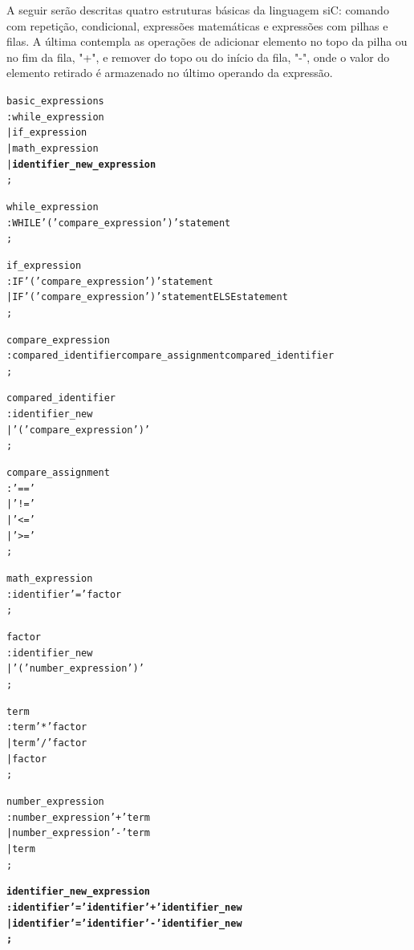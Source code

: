 \documentclass[12pt]{article}
\begin{document}
\indent 
\indent A seguir serão descritas quatro estruturas básicas da linguagem siC: comando com repetição, condicional, expressões matemáticas e expressões com pilhas e filas. A última contempla as operações de adicionar elemento no topo da pilha ou no fim da fila, "+", e remover do topo ou do início da fila, "-", onde o valor do elemento retirado é armazenado no último operando da expressão.
\begin{alltt}

basic\_expressions
    : while\_expression
    | if\_expression
    | math\_expression
    | \textbf{identifier\_new\_expression}
    ;	
		
while\_expression
    : WHILE '(' compare\_expression ')' statement
    ;

if\_expression
    : IF '(' compare\_expression ')' statement
    | IF '(' compare\_expression ')' statement ELSE statement
    ;
    
compare\_expression
    : compared\_identifier compare\_assignment compared\_identifier
    ;
    
compared\_identifier
    : identifier\_new
    | '(' compare\_expression ')'
    ;
    
compare\_assignment
    : '=='
    | '!='
    | '<='
    | '>='
    ;

math\_expression
    : identifier '=' factor
    ;

factor
    : identifier\_new
    | '(' number\_expression ')' 
    ;
    
term
    : term '*' factor
    | term '/' factor
    | factor
    ;

number\_expression
    : number\_expression '+' term
    | number\_expression '-' term
    | term
    ;
    
\textbf{
identifier\_new\_expression
    : identifier '=' identifier '+' identifier\_new
    | identifier '=' identifier '-' identifier\_new
    ;
}
			
\end{alltt}
\vspace{4mm}


\end{document}
